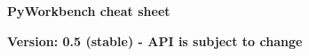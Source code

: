 \documentclass[9pt,landscape]{article}
\begin{document}
\raggedright
\footnotesize

\begin{center}
     \Huge{\textbf{PyWorkbench cheat sheet}} \\
\end{center}

\begin{center}
  \small{\textbf{Version: 0.5 (stable) - API is subject to change}} \\
\end{center}

\vspace{-0.15cm}
\noindent\makebox[\linewidth]{\rule{\paperwidth}{2pt}}
\end{document}
